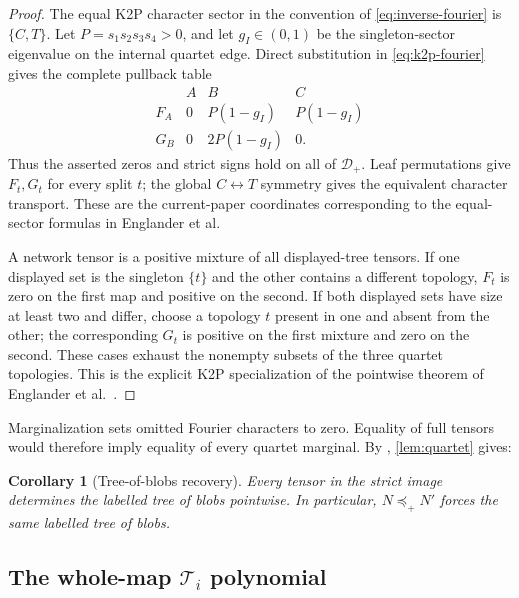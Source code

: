 \documentclass[11pt]{article}
\newtheorem{corollary}[theorem]{Corollary}
\theoremstyle{remark}
\newcommand{\Dplus}{\mathcal D_+}
\newcommand{\preceqplus}{\preceq_+}
\newcommand{\1}{\mathbf 1}
\begin{document}
\begin{proof}
The equal K2P character sector in the convention of
\eqref{eq:inverse-fourier} is \(\{C,T\}\).  Let
\(P=s_1s_2s_3s_4>0\), and let \(g_I\in(0,1)\) be the singleton-sector
eigenvalue on the internal quartet edge.  Direct substitution in
\eqref{eq:k2p-fourier} gives the complete pullback table
\[
\begin{array}{c|ccc}
 &A&B&C\\ \hline
F_A&0&P(1-g_I)&P(1-g_I)\\
G_B&0&2P(1-g_I)&0.
\end{array}
\]
Thus the asserted zeros and strict signs hold on all of \(\Dplus\).  Leaf
permutations give \(F_t,G_t\) for every split \(t\); the global
\(C\leftrightarrow T\) symmetry gives the equivalent character transport.
These are the current-paper coordinates corresponding to the equal-sector
formulas in Englander et al.

A network tensor is a positive mixture of all displayed-tree tensors.  If one
displayed set is the singleton \(\{t\}\) and the other contains a different
topology, \(F_t\) is zero on the first map and positive on the second.  If
both displayed sets have size at least two and differ, choose a topology
\(t\) present in one and absent from the other; the corresponding \(G_t\)
is positive on the first mixture and zero on the second.  These cases exhaust
the nonempty subsets of the three quartet topologies.  This is the explicit
K2P specialization of the pointwise theorem of
Englander et al.~\cite[Propositions~2.9--2.10 and
Theorem~2.11]{EnglanderEtAl2026}.
\end{proof}

Marginalization sets omitted Fourier characters to zero.  Equality of full
tensors would therefore imply equality of every quartet marginal.  By
\cite[Corollary~2.12]{EnglanderEtAl2026}, \cref{lem:quartet} gives:

\begin{corollary}[Tree-of-blobs recovery]\label{cor:tree-blobs}
Every tensor in the strict image determines the labelled tree of blobs
pointwise.  In particular, \(N\preceqplus N'\) forces the same labelled tree
of blobs.
\end{corollary}

\subsection{The whole-map \texorpdfstring{\(\mathcal T_i\)}{Ti} polynomial}
\end{document}
